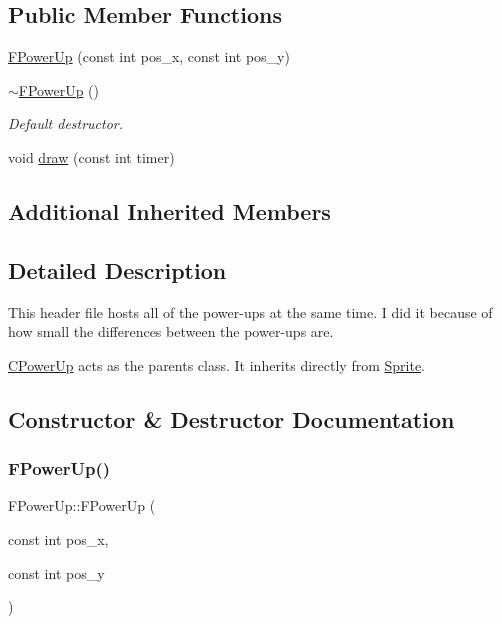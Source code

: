 \subsection*{Public Member Functions}
\begin{DoxyCompactItemize}
\item 
\hyperlink{classFPowerUp_a7377a01b8c39b7342fdb457e6635833c}{F\+Power\+Up} (const int pos\+\_\+x, const int pos\+\_\+y)
\item 
\hyperlink{classFPowerUp_aa062fd6a8f23d57dcb4e282583f3bfc8}{$\sim$\+F\+Power\+Up} ()
\begin{DoxyCompactList}\small\item\em Default destructor. \end{DoxyCompactList}\item 
void \hyperlink{classFPowerUp_aaf83782b032f53dacd37650127595148}{draw} (const int timer)
\end{DoxyCompactItemize}
\subsection*{Additional Inherited Members}


\subsection{Detailed Description}
This header file hosts all of the power-\/ups at the same time. I did it because of how small the differences between the power-\/ups are.

\hyperlink{classCPowerUp}{C\+Power\+Up} acts as the parent\textquotesingle{}s class. It inherits directly from \hyperlink{classSprite}{Sprite}. 

\subsection{Constructor \& Destructor Documentation}
\mbox{\label{classFPowerUp_a7377a01b8c39b7342fdb457e6635833c}} 
\subsubsection{\texorpdfstring{F\+Power\+Up()}{FPowerUp()}}
{\footnotesize\ttfamily F\+Power\+Up\+::\+F\+Power\+Up (\begin{DoxyParamCaption}\item[{const int}]{pos\+\_\+x,  }\item[{const int}]{pos\+\_\+y }\end{DoxyParamCaption})}

